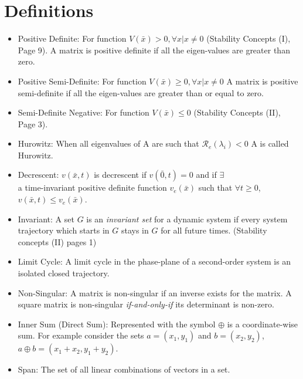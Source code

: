 \documentclass[12pt]{article}
\begin{document}
\section*{Definitions}

\begin{itemize}

\item Positive Definite: For function $V(\bar{x})>0, \forall x | x\neq0$ (Stability Concepts (I), Page 9). A matrix is positive definite if all the eigen-values are greater than zero. 

\item Positive Semi-Definite: For function $V(\bar{x})\geq0, \forall x | x\neq0$ A matrix is positive semi-definite if all the eigen-values are greater than or equal to zero. 

\item Semi-Definite Negative: For function $V(\bar{x})\leq0$ (Stability Concepts (II), Page 3). 

\item Hurowitz: When all eigenvalues of A are such that $\mathcal{R}_e(\lambda_i)<0$ A is called Hurowitz. 

\item Decrescent: $v(\bar{x},t)$ is decrescent if $v(\bar{0},t)=0$ and if $\exists$ \\ a time-invariant positive definite function $v_e(\bar{x})$ such that $\forall t\geq0$, $v(\bar{x},t)\leq v_e(\bar{x})$. 

\item Invariant: A set $G$ is an {\em invariant set} for a dynamic system if every system trajectory which starts in $G$ stays in $G$ for all future times. (Stability concepts (II) pages 1)

\item Limit Cycle: A limit cycle in the phase-plane of a second-order system is an isolated closed trajectory. 

\item Non-Singular: A matrix is non-singular if an inverse exists for the matrix. A square matrix is non-singular {\em if-and-only-if} its determinant is non-zero.

\item Inner Sum (Direct Sum): Represented with the symbol $\oplus$ is a coordinate-wise sum. For example consider the sets $a=(x_1,y_1)$ and $b=(x_2, y_2)$, $a\oplus b=(x_1+x_2,y_1+y_2)$.

\item Span: The set of all linear combinations of vectors in a set.


\end{itemize}
\end{document}
